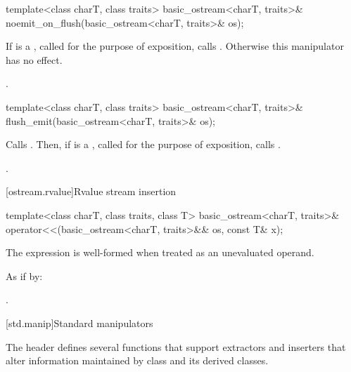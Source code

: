 %
\begin{itemdecl}
template<class charT, class traits>
  basic_ostream<charT, traits>& noemit_on_flush(basic_ostream<charT, traits>& os);
\end{itemdecl}

\begin{itemdescr}
\pnum
\effects
If  is a
,
called  for the purpose of exposition,
calls .
Otherwise this manipulator has no effect.

\pnum
\returns
{}.
\end{itemdescr}

%
\begin{itemdecl}
template<class charT, class traits>
  basic_ostream<charT, traits>& flush_emit(basic_ostream<charT, traits>& os);
\end{itemdecl}

\begin{itemdescr}
\pnum
\effects
Calls .
Then, if  is a
,
called  for the purpose of exposition,
calls .

\pnum
\returns
{}.
\end{itemdescr}

[ostream.rvalue]{Rvalue stream insertion}

%
\begin{itemdecl}
template<class charT, class traits, class T>
  basic_ostream<charT, traits>& operator<<(basic_ostream<charT, traits>&& os, const T& x);
\end{itemdecl}

\begin{itemdescr}
\pnum
\constraints The expression  is well-formed when treated as an unevaluated operand.

\pnum
\effects
As if by: 

\pnum
\returns
{}.
\end{itemdescr}


[std.manip]{Standard manipulators}

\pnum
The header  defines several functions that support
extractors and inserters that alter information maintained by class
 and its derived classes.

